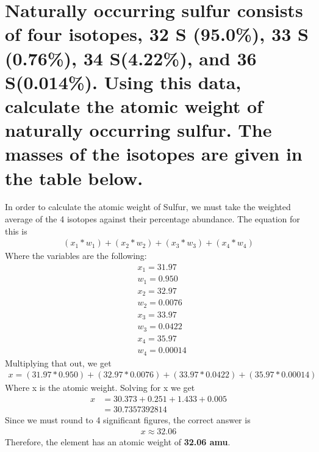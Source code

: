 \documentclass{scrartcl}
\begin{document}
\section{Naturally occurring sulfur consists of four isotopes, 32 S (95.0\%), 33 S (0.76\%), 34 S(4.22\%), and 36 S(0.014\%). Using this data, calculate the atomic weight of naturally occurring sulfur. The masses of the isotopes are given in the table below.}
\label{sec:org322421a}
In order to calculate the atomic weight of Sulfur, we must take the weighted
average of the 4 isotopes against their percentage abundance. The equation for
this is
\begin{align*}
(x_1*w_1)+(x_2*w_2)+(x_3*w_3)+(x_4*w_4)
\end{align*}
Where the variables are the following:
\begin{align*}
&x_{1}=31.97\\
&w_{1}=0.950\\
&x_{2}=32.97\\
&w_{2}=0.0076\\
&x_{3}=33.97\\
&w_{3}=0.0422\\
&x_{4}=35.97\\
&w_{4}=0.00014
\end{align*}
Multiplying that out, we get
\begin{align*}
x=(31.97*0.950)+(32.97*0.0076)+(33.97*0.0422)+(35.97*0.00014)
\end{align*}
Where x is the atomic weight. Solving for x we get
\begin{align*}
x&=30.373 + 0.251 + 1.433 + 0.005\\
&=30.7357392814
\end{align*}
Since we must round to 4 significant figures, the correct answer is
\begin{align*}
x\approx32.06
\end{align*}
Therefore, the element has an atomic weight of \textbf{32.06 amu}.
\end{document}
